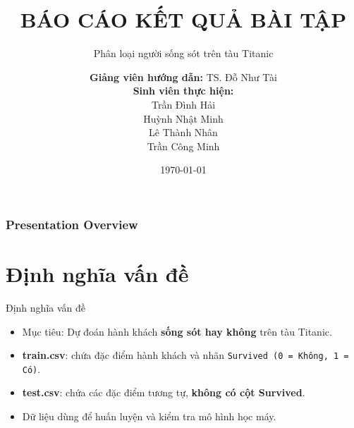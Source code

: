 \documentclass[
	11pt
]{beamer}
\title[BÁO CÁO KẾT QUẢ BÀI TẬP]{BÁO CÁO KẾT QUẢ BÀI TẬP}
\subtitle{Phân loại người sống sót trên tàu Titanic}
\author[Nhóm 4]{%
	\textbf{Giảng viên hướng dẫn:} TS. Đỗ Như Tài \\[0.8em]
	\textbf{Sinh viên thực hiện:}\\[0.3em]
	Trần Đình Hải \\ 
	Huỳnh Nhật Minh \\ 
	Lê Thành Nhân \\ 
	Trần Công Minh
}
\institute[SGU]{Trường Đại học Sài Gòn}
\date{\today}
\begin{document}
	


\begin{frame}
	\titlepage %
\end{frame}



\begin{frame}
	\frametitle{Presentation Overview} 
	
	\tableofcontents 
\end{frame}

\section{Định nghĩa vấn đề}
\begin{frame}{Định nghĩa vấn đề}
\begin{itemize}
    \item Mục tiêu: Dự đoán hành khách \textbf{sống sót hay không} trên tàu Titanic.
    \item \textbf{train.csv}: chứa đặc điểm hành khách và nhãn \texttt{Survived (0 = Không, 1 = Có)}.
    \item \textbf{test.csv}: chứa các đặc điểm tương tự, \textbf{không có cột Survived}.
    \item Dữ liệu dùng để huấn luyện và kiểm tra mô hình học máy.
\end{itemize}
\end{frame}
\end{document}
